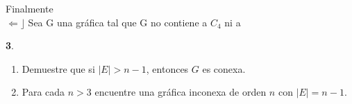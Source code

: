\documentclass[12pt]{article}
\begin{document}
Finalmente\\


$\Leftarrow \rfloor$ Sea G una gráfica tal que G no contiene a $C_4$ ni a 

%
%
\textbf{3}.

\begin{enumerate}[label=\alph*)]

    \item Demuestre que si $\mid E \mid > n - 1$, entonces $G$ es conexa.
    \begin{tcolorbox}[title=\textbf{Hipotesis}, colback=red!15!white, colframe=black!]

    \end{tcolorbox}
    \begin{tcolorbox}[title=\textbf{Definiciones}, colback=blue!15!white, colframe=black!]
    
    \end{tcolorbox}

    \item Para cada $n > 3$ encuentre una gráfica inconexa de orden $n$ con $|E| = n - 1$.
    \begin{tcolorbox}[title=\textbf{Hipotesis}, colback=red!15!white, colframe=black!]

    \end{tcolorbox}
    \begin{tcolorbox}[title=\textbf{Definiciones}, colback=blue!15!white, colframe=black!]
    
    \end{tcolorbox}
\end{enumerate}
\end{document}
